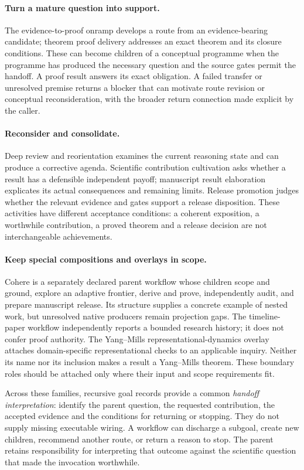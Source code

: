 \paragraph{Turn a mature question into support.}
The evidence-to-proof onramp develops a route from an evidence-bearing candidate;
theorem proof delivery addresses an exact theorem and its closure conditions.
These can become children of a conceptual programme when the programme has
produced the necessary question and the source gates permit the handoff.
A proof result answers its exact obligation. A failed transfer or unresolved
premise returns a blocker that can motivate route revision or conceptual
reconsideration, with the broader return connection made explicit by the caller.

\paragraph{Reconsider and consolidate.}
Deep review and reorientation examines the current reasoning state and can
produce a corrective agenda. Scientific contribution cultivation asks whether
a result has a defensible independent payoff; manuscript result elaboration
explicates its actual consequences and remaining limits. Release promotion
judges whether the relevant evidence and gates support a release disposition.
These activities have different acceptance conditions: a coherent exposition,
a worthwhile contribution, a proved theorem and a release decision are not
interchangeable achievements.

\paragraph{Keep special compositions and overlays in scope.}
Cohere is a separately declared parent workflow whose children scope and ground,
explore an adaptive frontier, derive and prove, independently audit, and prepare
manuscript release. Its structure supplies a concrete example of nested work,
but unresolved native producers remain projection gaps. The timeline-paper
workflow independently reports a bounded research history; it does not confer
proof authority. The Yang--Mills representational-dynamics overlay attaches
domain-specific representational checks to an applicable inquiry. Neither its
name nor its inclusion makes a result a Yang--Mills theorem. These boundary
roles should be attached only where their input and scope requirements fit.

Across these families, recursive goal records provide a common \emph{handoff
interpretation}: identify the parent question, the requested contribution, the
accepted evidence and the conditions for returning or stopping. They do not
supply missing executable wiring. A workflow can discharge a subgoal, create
new children, recommend another route, or return a reason to stop. The parent
retains responsibility for interpreting that outcome against the scientific
question that made the invocation worthwhile.
